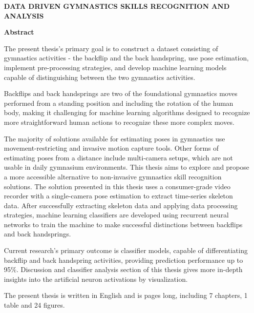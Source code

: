 \begin{titlepage}
\begin{center}

{\large \textbf{DATA DRIVEN GYMNASTICS SKILLS RECOGNITION AND ANALYSIS}}

\vspace*{1cm}

{\Large \textbf{Abstract}}

\vspace*{1cm}

\end{center}


The present thesis's primary goal is to construct a dataset consisting of gymnastics activities - the backflip and the back handspring, use pose estimation, implement pre-processing strategies, and develop machine learning models capable of distinguishing between the two gymnastics activities.

Backflips and back handsprings are two of the foundational gymnastics moves performed from a standing position and including the rotation of the human body, making it challenging for machine learning algorithms designed to recognize more straightforward human actions to recognize these more complex moves.

The majority of solutions available for estimating poses in gymnastics use movement-restricting and invasive motion capture tools. Other forms of estimating poses from a distance include multi-camera setups, which are not usable in daily gymnasium environments. This thesis aims to explore and propose a more accessible alternative to non-invasive gymnastics skill recognition solutions. The solution presented in this thesis uses a consumer-grade video recorder with a single-camera pose estimation to extract time-series skeleton data. After successfully extracting skeleton data and applying data processing strategies, machine learning classifiers are developed using recurrent neural networks to train the machine to make successful distinctions between backflips and back handsprings.

Current research's primary outcome is classifier models, capable of differentiating backflip and back handspring activities, providing prediction performance up to 95\%. Discussion and classifier analysis section of this thesis gives more in-depth insights into the artificial neuron activations by visualization.

The present thesis is written in English and is \pageref{LastPage} pages long, including 7 chapters, 1 table and 24 figures.

\end{titlepage}


